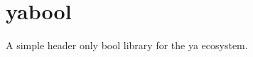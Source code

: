 \chapter{yabool}
\hypertarget{index}{}\label{index}
\label{index_md_README}%
%
 A simple header only bool library for the ya ecosystem. 